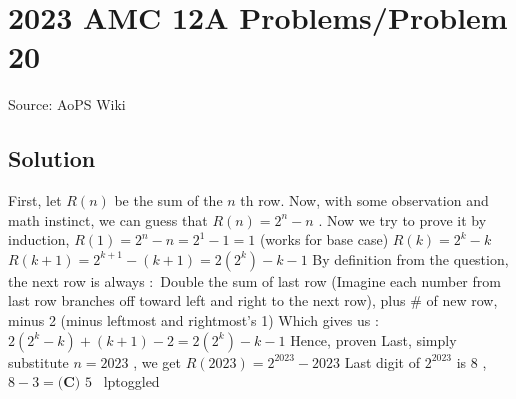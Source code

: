 \documentclass[12pt]{article}
\begin{document}
\section*{{2023 AMC 12A Problems/Problem 20}}
Source: AoPS Wiki

\subsection*{Solution}
First, let $R(n)$ be the sum of the $n$ th row. Now, with some observation and math instinct, we can guess that $R(n) = 2^n - n$ . Now we try to prove it by induction, $R(1) = 2^n - n = 2^1 - 1 = 1$ (works for base case) $R(k) = 2^k - k$ $R(k+1) = 2^{k+1} - (k + 1) = 2(2^k) - k - 1$ By definition from the question, the next row is always $:$ Double the sum of last row (Imagine each number from last row branches off toward left and right to the next row), plus # of new row, minus 2 (minus leftmost and rightmost's 1) Which gives us $:$ $2(2^k - k) + (k + 1) - 2 = 2(2^k) - k - 1$ Hence, proven Last, simply substitute $n = 2023$ , we get $R(2023) = 2^{2023} - 2023$ Last digit of $2^{2023}$ is $8$ , $8-3 = \boxed{\textbf{(C) } 5}$ ~lptoggled
\end{document}
